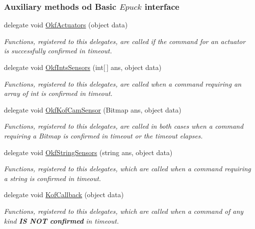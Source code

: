 \subsubsection*{Auxiliary methods od Basic $Epuck$ interface} %
\label{ssub:Auxiliary methods od Basic $Epuck$ interface}
  \begin{DoxyCompactItemize}

  \item delegate void \hyperlink{class_elib_1_1_epuck_a410eea190419792987ceb49c2a7b2c9b}{OkfActuators} (object data)
  \begin{DoxyCompactList}\small\item\em Functions, registered to this delegates, are called if the command for an actuator is successfully confirmed in timeout.   \end{DoxyCompactList}

  \item   delegate void \hyperlink{class_elib_1_1_epuck_ae28892dce5a837c025be2d29e80ccab7}{OkfIntsSensors} (int\mbox{[}$\,$\mbox{]} ans, object data)
  \begin{DoxyCompactList}\small\item\em Functions, registered to this delegates, are called when a command requiring an array of {\ttfamily int} is confirmed in timeout. \item\end{DoxyCompactList}

  \item  delegate void \hyperlink{class_elib_1_1_epuck_a0b10e3ac7ceeaee8f73bc5194366e3d4}{OkfKofCamSensor} (Bitmap ans, object data)
  \begin{DoxyCompactList}\small\item\em Functions, registered to this delegates, are called in both cases when a command requiring a {\ttfamily Bitmap} is confirmed in timeout or the timeout elapses. \item\end{DoxyCompactList}
  
  \item   delegate void \hyperlink{class_elib_1_1_epuck_a4bfdd999c7ba6f9e1282077b2cec1cc0}{OkfStringSensors} (string ans, object data)
  \begin{DoxyCompactList}\small\item\em Functions, registered to this delegates, which are called when a command requiring a {\ttfamily string} is confirmed in timeout. \item\end{DoxyCompactList}
  
  \item   delegate void \hyperlink{class_elib_1_1_epuck_a4bfdd999c7ba6f9e1282077b2cec1cc1}{KofCallback} (object data)
  \begin{DoxyCompactList}\small\item\em Functions, registered to this delegates, which are called when a command of any kind \textbf{IS NOT confirmed} in timeout. \item\end{DoxyCompactList}

  \end{DoxyCompactItemize}

